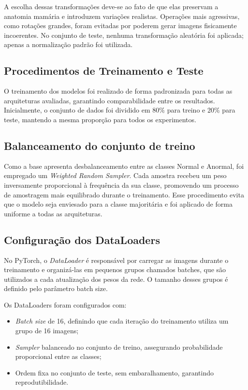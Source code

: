 A escolha dessas transformações deve-se ao fato de que elas preservam a anatomia mamária e introduzem variações realistas. Operações mais agressivas, como rotações grandes, foram evitadas por poderem gerar imagens fisicamente incoerentes. No conjunto de teste, nenhuma transformação aleatória foi aplicada; apenas a normalização padrão foi utilizada.

\subsection{Procedimentos de Treinamento e Teste}\label{subsec:procedimentos_treinamento}

O treinamento dos modelos foi realizado de forma padronizada para todas as arquiteturas avaliadas, garantindo comparabilidade entre os resultados. Inicialmente, o conjunto de dados foi dividido em 80\% para treino e 20\% para teste, mantendo a mesma proporção para todos os experimentos.

\subsection*{Balanceamento do conjunto de treino}

Como a base apresenta desbalanceamento entre as classes Normal e Anormal, foi empregado um \textit{Weighted Random Sampler}. Cada amostra recebeu um peso inversamente proporcional à frequência da sua classe, promovendo um processo de amostragem mais equilibrado durante o treinamento. Esse procedimento evita que o modelo seja enviesado para a classe majoritária e foi aplicado de forma uniforme a todas as arquiteturas.

\subsection*{Configuração dos DataLoaders}

No PyTorch, o \textit{DataLoader} é responsável por carregar as imagens durante o treinamento e organizá-las em pequenos grupos chamados batches, que são utilizados a cada atualização dos pesos da rede. O tamanho desses grupos é definido pelo parâmetro batch size.

Os DataLoaders foram configurados com:

\begin{itemize}
    \item \textit{Batch size} de 16, definindo que cada iteração do treinamento utiliza um grupo de 16 imagens;
    \item \textit{Sampler} balanceado no conjunto de treino, assegurando probabilidade proporcional entre as classes;
    \item Ordem fixa no conjunto de teste, sem embaralhamento, garantindo reprodutibilidade.
\end{itemize}

